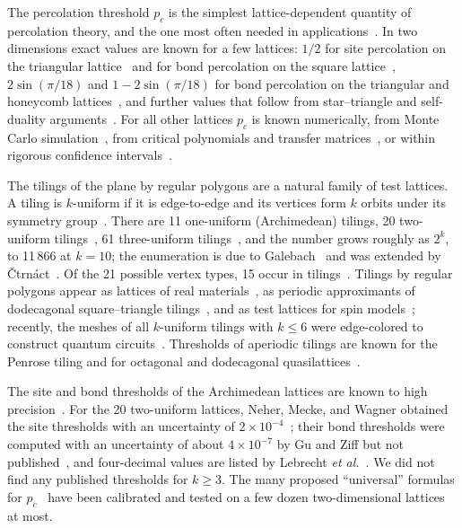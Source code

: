 \documentclass[pre,twocolumn,superscriptaddress,longbibliography,floatfix]{revtex4-2}
\newcommand{\pc}{p_c}
\begin{document}
The percolation threshold $\pc$ is the simplest lattice-dependent quantity of percolation theory, and the one most often needed in applications~\cite{StaufferAharony,Grimmett99}. In two dimensions exact values are known for a few lattices: $1/2$ for site percolation on the triangular lattice~\cite{Kesten82} and for bond percolation on the square lattice~\cite{Kesten80}, $2\sin(\pi/18)$ and $1-2\sin(\pi/18)$ for bond percolation on the triangular and honeycomb lattices~\cite{SykesEssam64,Wierman81}, and further values that follow from star--triangle and self-duality arguments~\cite{SykesEssam64,ZiffScullard06,ScullardZiff08,WiermanZiff11,GrimmettManolescu14}. For all other lattices $\pc$ is known numerically, from Monte Carlo simulation~\cite{NewmanZiff00,NewmanZiff01,FengDengBlote08}, from critical polynomials and transfer matrices~\cite{ScullardJacobsen12,JacobsenScullard13,Jacobsen14,Jacobsen15,ScullardJacobsen20}, or within rigorous confidence intervals~\cite{RiordanWalters07}.

The tilings of the plane by regular polygons are a natural family of test lattices. A tiling is $k$-uniform if it is edge-to-edge and its vertices form $k$ orbits under its symmetry group~\cite{GrunbaumShephard87}. There are 11 one-uniform (Archimedean) tilings, 20 two-uniform tilings~\cite{GrunbaumShephard87}, 61 three-uniform tilings~\cite{Chavey84,Chavey89}, and the number grows roughly as $2^k$, to 11\,866 at $k=10$; the enumeration is due to Galebach~\cite{Galebach,OEIS_A068599} and was extended by \v{C}trn\'act~\cite{OEIS_A068599,TesCatalog}. Of the 21 possible vertex types, 15 occur in tilings~\cite{GrunbaumShephard87}. Tilings by regular polygons appear as lattices of real materials~\cite{Li22}, as periodic approximants of dodecagonal square--triangle tilings~\cite{OxborrowHenley93}, and as test lattices for spin models~\cite{Yu17}; recently, the meshes of all $k$-uniform tilings with $k\le6$ were edge-colored to construct quantum circuits~\cite{Kattemolle25}. Thresholds of aperiodic tilings are known for the Penrose tiling and for octagonal and dodecagonal quasilattices~\cite{Babalievski95,ZiffBabalievski99}.

The site and bond thresholds of the Archimedean lattices are known to high precision~\cite{SudingZiff99,Parviainen07,FengDengBlote08,Jacobsen14,Jacobsen15,ScullardJacobsen20}. For the 20 two-uniform lattices, Neher, Mecke, and Wagner obtained the site thresholds with an uncertainty of $2\times10^{-4}$~\cite{Neher08,Neher08supp}; their bond thresholds were computed with an uncertainty of about $4\times10^{-7}$ by Gu and Ziff but not published~\cite{GuZiff}, and four-decimal values are listed by Lebrecht \textit{et al.}~\cite{Lebrecht21}. We did not find any published thresholds for $k\ge3$. The many proposed ``universal'' formulas for $\pc$~\cite{ScherZallen70,Vyssotsky61,GalamMauger96,GalamMauger97,GalamMauger98,vanderMarck97,WiermanNaor05,Neher08,Lebrecht21} have been calibrated and tested on a few dozen two-dimensional lattices at most.
\end{document}

